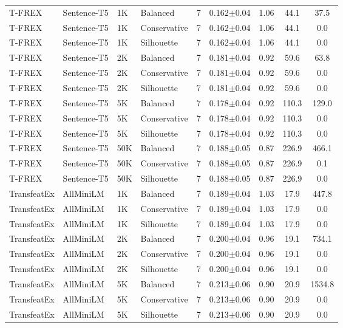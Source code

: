 \begin{table*}[htbp]
\begin{tabular}{|l|l|l|l|c|c|c|c|c|}
\hline
T-FREX & Sentence-T5 & 1K & Balanced & 7 & 0.162$\pm$0.04 & 1.06 & 44.1 & 37.5 \\
T-FREX & Sentence-T5 & 1K & Conservative & 7 & 0.162$\pm$0.04 & 1.06 & 44.1 & 0.0 \\
T-FREX & Sentence-T5 & 1K & Silhouette & 7 & 0.162$\pm$0.04 & 1.06 & 44.1 & 0.0 \\
T-FREX & Sentence-T5 & 2K & Balanced & 7 & 0.181$\pm$0.04 & 0.92 & 59.6 & 63.8 \\
T-FREX & Sentence-T5 & 2K & Conservative & 7 & 0.181$\pm$0.04 & 0.92 & 59.6 & 0.0 \\
T-FREX & Sentence-T5 & 2K & Silhouette & 7 & 0.181$\pm$0.04 & 0.92 & 59.6 & 0.0 \\
T-FREX & Sentence-T5 & 5K & Balanced & 7 & 0.178$\pm$0.04 & 0.92 & 110.3 & 129.0 \\
T-FREX & Sentence-T5 & 5K & Conservative & 7 & 0.178$\pm$0.04 & 0.92 & 110.3 & 0.0 \\
T-FREX & Sentence-T5 & 5K & Silhouette & 7 & 0.178$\pm$0.04 & 0.92 & 110.3 & 0.0 \\
T-FREX & Sentence-T5 & 50K & Balanced & 7 & 0.188$\pm$0.05 & 0.87 & 226.9 & 466.1 \\
T-FREX & Sentence-T5 & 50K & Conservative & 7 & 0.188$\pm$0.05 & 0.87 & 226.9 & 0.1 \\
T-FREX & Sentence-T5 & 50K & Silhouette & 7 & 0.188$\pm$0.05 & 0.87 & 226.9 & 0.0 \\
\hline
TransfeatEx & AllMiniLM & 1K & Balanced & 7 & 0.189$\pm$0.04 & 1.03 & 17.9 & 447.8 \\
TransfeatEx & AllMiniLM & 1K & Conservative & 7 & 0.189$\pm$0.04 & 1.03 & 17.9 & 0.0 \\
TransfeatEx & AllMiniLM & 1K & Silhouette & 7 & 0.189$\pm$0.04 & 1.03 & 17.9 & 0.0 \\
TransfeatEx & AllMiniLM & 2K & Balanced & 7 & 0.200$\pm$0.04 & 0.96 & 19.1 & 734.1 \\
TransfeatEx & AllMiniLM & 2K & Conservative & 7 & 0.200$\pm$0.04 & 0.96 & 19.1 & 0.0 \\
TransfeatEx & AllMiniLM & 2K & Silhouette & 7 & 0.200$\pm$0.04 & 0.96 & 19.1 & 0.0 \\
TransfeatEx & AllMiniLM & 5K & Balanced & 7 & 0.213$\pm$0.06 & 0.90 & 20.9 & 1534.8 \\
TransfeatEx & AllMiniLM & 5K & Conservative & 7 & 0.213$\pm$0.06 & 0.90 & 20.9 & 0.0 \\
TransfeatEx & AllMiniLM & 5K & Silhouette & 7 & 0.213$\pm$0.06 & 0.90 & 20.9 & 0.0 \\

\end{tabular}
\end{table*}
